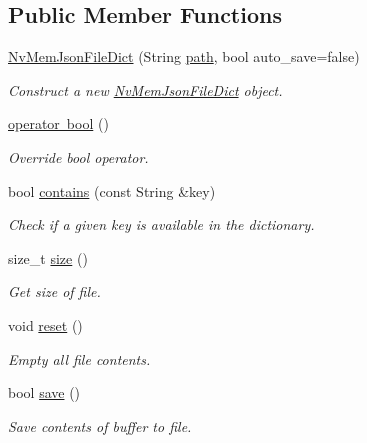 \subsection*{Public Member Functions}
\begin{DoxyCompactItemize}
\item 
\mbox{\hyperlink{class_nv_mem_json_file_dict_aaf16ed30510b3fbce9d4ef07c445a86d}{Nv\+Mem\+Json\+File\+Dict}} (String \mbox{\hyperlink{class_nv_mem_json_file_dict_a9cf7220ebdf23d391790506e165e14d7}{path}}, bool auto\+\_\+save=false)
\begin{DoxyCompactList}\small\item\em Construct a new \mbox{\hyperlink{class_nv_mem_json_file_dict}{Nv\+Mem\+Json\+File\+Dict}} object. \end{DoxyCompactList}\item 
\mbox{\hyperlink{class_nv_mem_json_file_dict_ab406cffea8b169cbf609f082dc24994f}{operator bool}} ()
\begin{DoxyCompactList}\small\item\em Override bool operator. \end{DoxyCompactList}\item 
bool \mbox{\hyperlink{class_nv_mem_json_file_dict_af7e546ec407e5e07425b938a04ab8b6a}{contains}} (const String \&key)
\begin{DoxyCompactList}\small\item\em Check if a given {\ttfamily key} is available in the dictionary. \end{DoxyCompactList}\item 
size\+\_\+t \mbox{\hyperlink{class_nv_mem_json_file_dict_ae00ca1a78ae7e0d71fc8f36bc97bb32d}{size}} ()
\begin{DoxyCompactList}\small\item\em Get size of file. \end{DoxyCompactList}\item 
void \mbox{\hyperlink{class_nv_mem_json_file_dict_aa66c932e83655464e279861f1685e2ff}{reset}} ()
\begin{DoxyCompactList}\small\item\em Empty all file contents. \end{DoxyCompactList}\item 
bool \mbox{\hyperlink{class_nv_mem_json_file_dict_aee40593d8ea5dd5ecb3fead948b931b0}{save}} ()
\begin{DoxyCompactList}\small\item\em Save contents of buffer to file. \end{DoxyCompactList}\item 

\end{DoxyCompactItemize}
